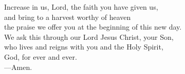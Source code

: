 \prayer


\begin{prayerverse}
Increase in us, Lord, the faith you have given us,\\
and bring to a harvest worthy of heaven\\
the praise we offer you at the beginning of this new day.\\
We ask this through our Lord Jesus Christ, your Son,\\
who lives and reigns with you and the Holy Spirit,\\
God, for ever and ever.\\
{\color{red}---\thinspace}Amen.
\end{prayerverse}

